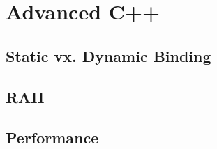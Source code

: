 \section{Advanced C++}

\subsection{Static vx. Dynamic Binding}


\subsection{RAII}


\subsection{Performance}

